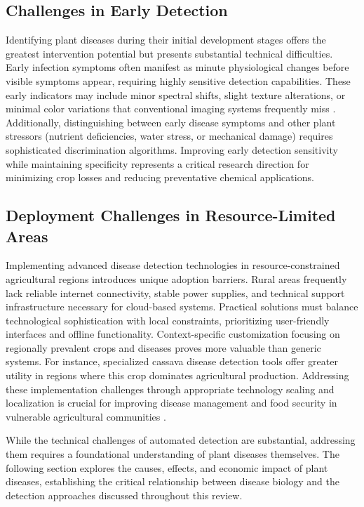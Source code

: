\documentclass[sn-mathphys]{sn-jnl}
\theoremstyle{thmstyleone}%
\theoremstyle{thmstyletwo}%
\theoremstyle{thmstylethree}%
\begin{document}
\subsection{Challenges in Early Detection} 
Identifying plant diseases during their initial development stages offers the greatest intervention potential but presents substantial technical difficulties. Early infection symptoms often manifest as minute physiological changes before visible symptoms appear, requiring highly sensitive detection capabilities. These early indicators may include minor spectral shifts, slight texture alterations, or minimal color variations that conventional imaging systems frequently miss \citep{mitra2021emerging}. Additionally, distinguishing between early disease symptoms and other plant stressors (nutrient deficiencies, water stress, or mechanical damage) requires sophisticated discrimination algorithms. Improving early detection sensitivity while maintaining specificity represents a critical research direction for minimizing crop losses and reducing preventative chemical applications.

\subsection{Deployment Challenges in Resource-Limited Areas} 
Implementing advanced disease detection technologies in resource-constrained agricultural regions introduces unique adoption barriers. Rural areas frequently lack reliable internet connectivity, stable power supplies, and technical support infrastructure necessary for cloud-based systems. Practical solutions must balance technological sophistication with local constraints, prioritizing user-friendly interfaces and offline functionality. Context-specific customization focusing on regionally prevalent crops and diseases proves more valuable than generic systems. For instance, specialized cassava disease detection tools offer greater utility in regions where this crop dominates agricultural production. Addressing these implementation challenges through appropriate technology scaling and localization is crucial for improving disease management and food security in vulnerable agricultural communities \citep{neupane2021automatic}.

\par While the technical challenges of automated detection are substantial, addressing them requires a foundational understanding of plant diseases themselves. The following section explores the causes, effects, and economic impact of plant diseases, establishing the critical relationship between disease biology and the detection approaches discussed throughout this review.
\end{document}
